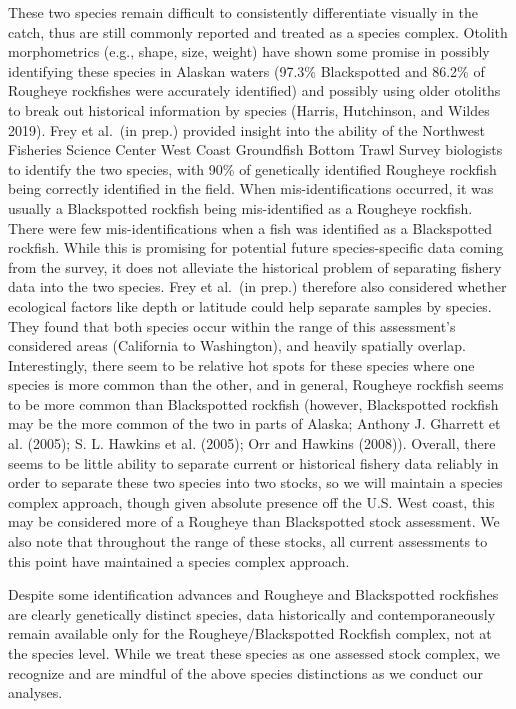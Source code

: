 \documentclass[
]{scrartcl}
\begin{document}
These two species remain difficult to consistently differentiate
visually in the catch, thus are still commonly reported and treated as a
species complex. Otolith morphometrics (e.g., shape, size, weight) have
shown some promise in possibly identifying these species in Alaskan
waters (97.3\% Blackspotted and 86.2\% of Rougheye rockfishes were
accurately identified) and possibly using older otoliths to break out
historical information by species (Harris, Hutchinson, and Wildes 2019).
Frey et al.~(in prep.) provided insight into the ability of the
Northwest Fisheries Science Center West Coast Groundfish Bottom Trawl
Survey biologists to identify the two species, with 90\% of genetically
identified Rougheye rockfish being correctly identified in the field.
When mis-identifications occurred, it was usually a Blackspotted
rockfish being mis-identified as a Rougheye rockfish. There were few
mis-identifications when a fish was identified as a Blackspotted
rockfish. While this is promising for potential future species-specific
data coming from the survey, it does not alleviate the historical
problem of separating fishery data into the two species. Frey et al.~(in
prep.) therefore also considered whether ecological factors like depth
or latitude could help separate samples by species. They found that both
species occur within the range of this assessment's considered areas
(California to Washington), and heavily spatially overlap.
Interestingly, there seem to be relative hot spots for these species
where one species is more common than the other, and in general,
Rougheye rockfish seems to be more common than Blackspotted rockfish
(however, Blackspotted rockfish may be the more common of the two in
parts of Alaska; Anthony J. Gharrett et al. (2005); S. L. Hawkins et al.
(2005); Orr and Hawkins (2008)). Overall, there seems to be little
ability to separate current or historical fishery data reliably in order
to separate these two species into two stocks, so we will maintain a
species complex approach, though given absolute presence off the U.S.
West coast, this may be considered more of a Rougheye than Blackspotted
stock assessment. We also note that throughout the range of these
stocks, all current assessments to this point have maintained a species
complex approach.

Despite some identification advances and Rougheye and Blackspotted
rockfishes are clearly genetically distinct species, data historically
and contemporaneously remain available only for the
Rougheye/Blackspotted Rockfish complex, not at the species level. While
we treat these species as one assessed stock complex, we recognize and
are mindful of the above species distinctions as we conduct our
analyses.
\end{document}
